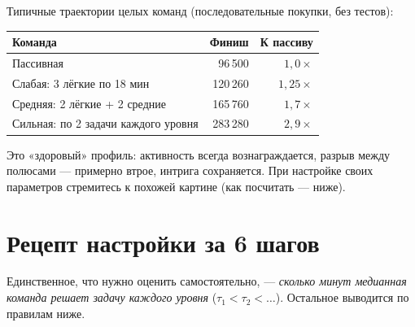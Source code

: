 \documentclass[12pt,a4paper]{article}
\begin{document}
Типичные траектории целых команд (последовательные покупки, без тестов):

\begin{center}
\begin{tabular}{lrr}
\toprule
Команда & Финиш & К пассиву \\
\midrule
Пассивная                                  & 96\,500  & $1{,}0\times$ \\
Слабая: 3 лёгкие по 18 мин                 & 120\,260 & $1{,}25\times$ \\
Средняя: 2 лёгкие + 2 средние              & 165\,760 & $1{,}7\times$ \\
Сильная: по 2 задачи каждого уровня        & 283\,280 & $2{,}9\times$ \\
\bottomrule
\end{tabular}
\end{center}

Это «здоровый» профиль: активность всегда вознаграждается, разрыв
между полюсами --- примерно втрое, интрига сохраняется. При настройке
своих параметров стремитесь к похожей картине (как посчитать --- ниже).

\section{Рецепт настройки за 6 шагов}

Единственное, что нужно оценить самостоятельно, --- \emph{сколько минут
медианная команда решает задачу каждого уровня} ($\tau_1 < \tau_2 < \dots$).
Остальное выводится по правилам ниже.
\end{document}

